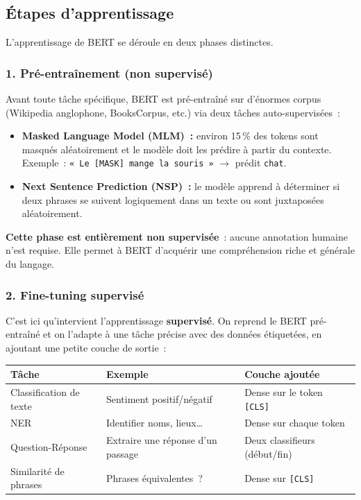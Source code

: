 \documentclass[12pt,a4paper]{article}
\begin{document}
\pagebreak

\subsection{Étapes d'apprentissage}

L'apprentissage de BERT se déroule en deux phases distinctes.

\subsubsection{1. Pré-entraînement (non supervisé)}

Avant toute tâche spécifique, BERT est pré-entraîné sur d'énormes corpus (Wikipedia
anglophone, BooksCorpus, etc.) via deux tâches auto-supervisées~:

\begin{itemize}[leftmargin=1.5cm]
  \item \textbf{Masked Language Model (MLM)~:} environ 15\,\% des tokens sont masqués
    aléatoirement et le modèle doit les prédire à partir du contexte.
    Exemple~: \texttt{« Le [MASK] mange la souris »} $\rightarrow$ prédit \texttt{chat}.
  \item \textbf{Next Sentence Prediction (NSP)~:} le modèle apprend à déterminer si
    deux phrases se suivent logiquement dans un texte ou sont juxtaposées aléatoirement.
\end{itemize}

\textbf{Cette phase est entièrement non supervisée}~: aucune annotation humaine n'est requise.
Elle permet à BERT d'acquérir une compréhension riche et générale du langage.

\subsubsection{2. Fine-tuning supervisé}

C'est ici qu'intervient l'apprentissage \textbf{supervisé}. On reprend le BERT pré-entraîné
et on l'adapte à une tâche précise avec des données étiquetées, en ajoutant une petite
couche de sortie~:

\begin{center}
\begin{tabular}{@{}L{6cm}L{4.5cm}L{5cm}@{}}
  \toprule
  Tâche & Exemple & Couche ajoutée \\
  \midrule
  Classification de texte & Sentiment positif/négatif & Dense sur le token \texttt{[CLS]} \\
  NER\footnotemark & Identifier noms, lieux\ldots & Dense sur chaque token \\
  Question-Réponse & Extraire une réponse d'un passage & Deux classifieurs (début/fin) \\
  Similarité de phrases & Phrases équivalentes~? & Dense sur \texttt{[CLS]} \\
  \bottomrule
\end{tabular}
\end{center}
\end{document}
